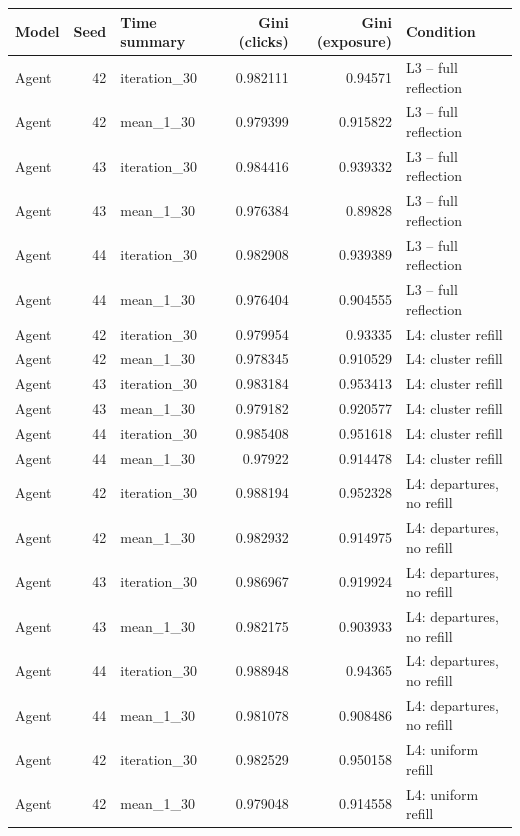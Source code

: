 \begin{table}[htbp!]
\centering
\small
\setlength{\tabcolsep}{3pt}
\renewcommand{\arraystretch}{1.1}
\begin{tabular}{lrlrrl}
\hline
Model & Seed & Time summary & Gini (clicks) & Gini (exposure) & Condition \\
\hline
Agent & 42 & iteration\_30 & 0.982111 & 0.94571 & L3 -- full reflection \\
Agent & 42 & mean\_1\_30 & 0.979399 & 0.915822 & L3 -- full reflection \\
Agent & 43 & iteration\_30 & 0.984416 & 0.939332 & L3 -- full reflection \\
Agent & 43 & mean\_1\_30 & 0.976384 & 0.89828 & L3 -- full reflection \\
Agent & 44 & iteration\_30 & 0.982908 & 0.939389 & L3 -- full reflection \\
Agent & 44 & mean\_1\_30 & 0.976404 & 0.904555 & L3 -- full reflection \\
Agent & 42 & iteration\_30 & 0.979954 & 0.93335 & L4: cluster refill \\
Agent & 42 & mean\_1\_30 & 0.978345 & 0.910529 & L4: cluster refill \\
Agent & 43 & iteration\_30 & 0.983184 & 0.953413 & L4: cluster refill \\
Agent & 43 & mean\_1\_30 & 0.979182 & 0.920577 & L4: cluster refill \\
Agent & 44 & iteration\_30 & 0.985408 & 0.951618 & L4: cluster refill \\
Agent & 44 & mean\_1\_30 & 0.97922 & 0.914478 & L4: cluster refill \\
Agent & 42 & iteration\_30 & 0.988194 & 0.952328 & L4: departures, no refill \\
Agent & 42 & mean\_1\_30 & 0.982932 & 0.914975 & L4: departures, no refill \\
Agent & 43 & iteration\_30 & 0.986967 & 0.919924 & L4: departures, no refill \\
Agent & 43 & mean\_1\_30 & 0.982175 & 0.903933 & L4: departures, no refill \\
Agent & 44 & iteration\_30 & 0.988948 & 0.94365 & L4: departures, no refill \\
Agent & 44 & mean\_1\_30 & 0.981078 & 0.908486 & L4: departures, no refill \\
Agent & 42 & iteration\_30 & 0.982529 & 0.950158 & L4: uniform refill \\
Agent & 42 & mean\_1\_30 & 0.979048 & 0.914558 & L4: uniform refill \\

\end{tabular}
\end{table}
